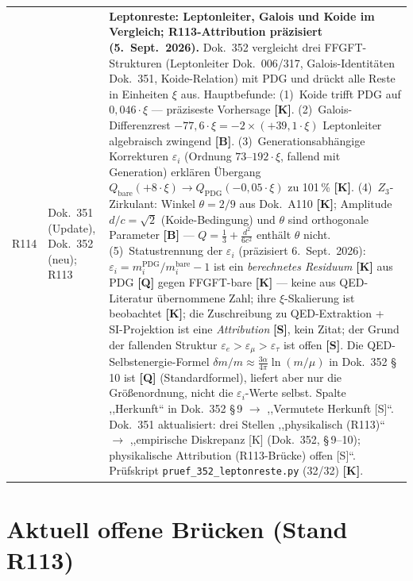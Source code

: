 \begin{longtable}{@{}p{0.9cm}p{3.1cm}p{10.2cm}@{}}
R114 & Dok.~351 (Update), Dok.~352 (neu); R113 & \textbf{Leptonreste: Leptonleiter, Galois und Koide im Vergleich; R113-Attribution präzisiert \QM{} (5.~Sept.~2026).} Dok.~352 vergleicht drei FFGFT-Strukturen (Leptonleiter Dok.~006/317, Galois-Identitäten Dok.~351, Koide-Relation) mit PDG und drückt alle Reste in Einheiten $\xi$ aus. Hauptbefunde: (1)~Koide trifft PDG auf $0{,}046\cdot\xi$ --- präziseste Vorhersage \textbf{[K]}. (2)~Galois-Differenzrest $-77{,}6\cdot\xi = -2\times(+39{,}1\cdot\xi)$ Leptonleiter algebraisch zwingend \textbf{[B]}. (3)~Generationsabhängige Korrekturen $\varepsilon_i$ (Ordnung $73$--$192\cdot\xi$, fallend mit Generation) erklären Übergang $Q_{\mathrm{bare}}(+8\cdot\xi)\to Q_{\mathrm{PDG}}(-0{,}05\cdot\xi)$ zu 101\,\% \textbf{[K]}. (4)~$Z_3$-Zirkulant: Winkel $\theta=2/9$ aus Dok.~A110 \textbf{[K]}; Amplitude $d/c=\sqrt{2}$ (Koide-Bedingung) und $\theta$ sind orthogonale Parameter \textbf{[B]} --- $Q=\tfrac{1}{3}+\tfrac{d^2}{6c^2}$ enthält $\theta$ nicht. (5)~Statustrennung der $\varepsilon_i$ (präzisiert 6.~Sept.~2026): $\varepsilon_i = m_i^{\mathrm{PDG}}/m_i^{\mathrm{bare}} - 1$ ist ein \emph{berechnetes Residuum} \textbf{[K]} aus PDG \textbf{[Q]} gegen FFGFT-bare \textbf{[K]} --- keine aus QED-Literatur übernommene Zahl; ihre $\xi$-Skalierung ist beobachtet \textbf{[K]}; die Zuschreibung zu QED-Extraktion + SI-Projektion ist eine \emph{Attribution} \textbf{[S]}, kein Zitat; der Grund der fallenden Struktur $\varepsilon_e>\varepsilon_\mu>\varepsilon_\tau$ ist offen \textbf{[S]}. Die QED-Selbstenergie-Formel $\delta m/m\approx\tfrac{3\alpha}{4\pi}\ln(m/\mu)$ in Dok.~352 §\,10 ist \textbf{[Q]} (Standardformel), liefert aber nur die Größenordnung, nicht die $\varepsilon_i$-Werte selbst. Spalte ,,Herkunft`` in Dok.~352 §\,9 $\to$ ,,Vermutete Herkunft [S]``. Dok.~351 aktualisiert: drei Stellen ,,physikalisch (R113)`` $\to$ ,,empirische Diskrepanz [K] (Dok.~352, §\,9--10); physikalische Attribution (R113-Brücke) offen [S]``. Prüfskript \texttt{pruef\_352\_leptonreste.py} (32/32) \textbf{[K]}. \\
\end{longtable}
\endgroup

\section{Aktuell offene Br\"ucken (Stand R113)}

